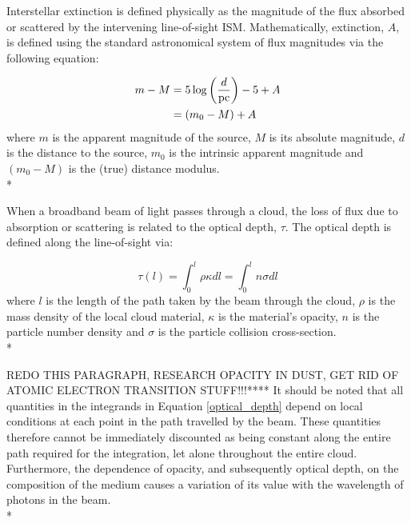 \documentclass[12pt, a4paper]{report}
\begin{document}


Interstellar extinction is defined physically as the magnitude of the flux absorbed or scattered by the intervening line-of-sight ISM. Mathematically, extinction, $A$, is defined using the standard astronomical system of flux magnitudes via the following equation:

\begin{align}
\begin{split}
m - M &= 5\log\left(\frac{d}{\textnormal{pc}}\right) - 5 + A \\
      &= (m_{0} - M) + A
\end{split}
\label{ext_def_app_mag}
\end{align}
where $m$ is the apparent magnitude of the source, $M$ is its absolute magnitude, $d$ is the distance to the source, $m_{0}$ is the intrinsic apparent magnitude and $(m_{0} - M)$ is the (true) distance modulus. \\*

When a broadband beam of light passes through a cloud, the loss of flux due to absorption or scattering is related to the optical depth, $\tau$. The optical depth is defined along the line-of-sight via:

\begin{equation}
\tau(l) = \int_{0}^{l} \rho \kappa dl = \int_{0}^{l} n \sigma dl
\label{optical_depth}
\end{equation}
where $l$ is the length of the path taken by the beam through the cloud, $\rho$ is the mass density of the local cloud material, $\kappa$ is the material's opacity, $n$ is the particle number density and $\sigma$ is the particle collision cross-section.\\*


REDO THIS PARAGRAPH, RESEARCH OPACITY IN DUST, GET RID OF ATOMIC ELECTRON TRANSITION STUFF!!!****
It should be noted that all quantities in the integrands in Equation \ref{optical_depth} depend on local conditions at each point in the path travelled by the beam. These quantities therefore cannot be immediately discounted as being constant along the entire path required for the integration, let alone throughout the entire cloud. Furthermore, the dependence of opacity, and subsequently optical depth, on the composition of the medium causes a variation of its value with the wavelength of photons in the beam.\\*
\end{document}
